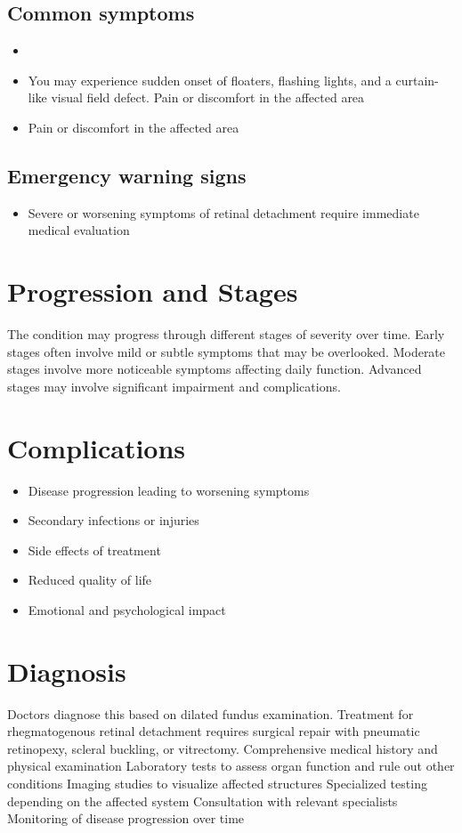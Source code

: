 \subsection{Common symptoms}
\begin{itemize}[noitemsep]
  \item \item You may experience sudden onset of floaters, flashing lights, and a curtain-like visual field defect. Pain or discomfort in the affected area    \item Pain or discomfort in the affected area
  \end{itemize}

\subsection{Emergency warning signs}
\begin{itemize}[noitemsep]
  \item Severe or worsening symptoms of retinal detachment require immediate medical evaluation
\end{itemize}
\section{Progression and Stages}
The condition may progress through different stages of severity over time. Early stages often involve mild or subtle symptoms that may be overlooked. Moderate stages involve more noticeable symptoms affecting daily function. Advanced stages may involve significant impairment and complications.
\section{Complications}
\begin{itemize}[noitemsep]
  \item Disease progression leading to worsening symptoms
  \item Secondary infections or injuries
  \item Side effects of treatment
  \item Reduced quality of life
  \item Emotional and psychological impact
\end{itemize}
\section{Diagnosis}
Doctors diagnose this based on dilated fundus examination. Treatment for rhegmatogenous retinal detachment requires surgical repair with pneumatic retinopexy, scleral buckling, or vitrectomy. Comprehensive medical history and physical examination Laboratory tests to assess organ function and rule out other conditions Imaging studies to visualize affected structures Specialized testing depending on the affected system Consultation with relevant specialists Monitoring of disease progression over time

